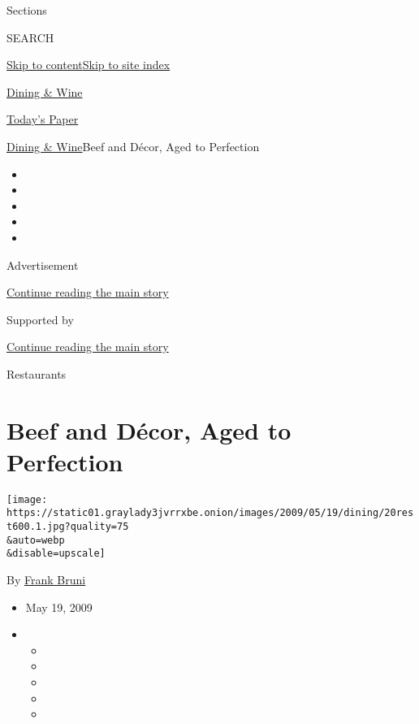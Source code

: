 Sections

SEARCH

\protect\hyperlink{site-content}{Skip to
content}\protect\hyperlink{site-index}{Skip to site index}

\href{https://www.nytimes3xbfgragh.onion/pages/dining/index.html}{Dining
\& Wine}

\href{https://myaccount.nytimes3xbfgragh.onion/auth/login?response_type=cookie\&client_id=vi}{}

\href{https://www.nytimes3xbfgragh.onion/section/todayspaper}{Today's
Paper}

\href{/pages/dining/index.html}{Dining \& Wine}\textbar{}Beef and Décor,
Aged to Perfection

\begin{itemize}
\item
\item
\item
\item
\item
\end{itemize}

Advertisement

\protect\hyperlink{after-top}{Continue reading the main story}

Supported by

\protect\hyperlink{after-sponsor}{Continue reading the main story}

Restaurants

\hypertarget{beef-and-duxe9cor-aged-to-perfection}{%
\section{Beef and Décor, Aged to
Perfection}\label{beef-and-duxe9cor-aged-to-perfection}}

\texttt{[image: https://static01.graylady3jvrrxbe.onion/images/2009/05/19/dining/20rest600.1.jpg?quality=75\\\&auto=webp\\\&disable=upscale]}

By \href{https://www.nytimes3xbfgragh.onion/by/frank-bruni}{Frank Bruni}

\begin{itemize}
\item
  May 19, 2009
\item
  \begin{itemize}
  \item
  \item
  \item
  \item
  \item
  \end{itemize}
\end{itemize}

